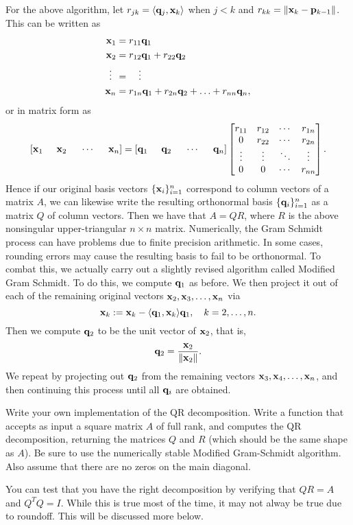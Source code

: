 For the above algorithm, let $r_{j k} = \langle {\bf q}_j, {\bf x}_k\rangle$ when $j < k$ and
$r_{kk} = \|{\bf x}_k-{\bf p}_{k-1}\|$.
This can be written as
\begin{align*}
{\bf x}_1 &= r_{1 1} {\bf q}_1\\
{\bf x}_2 &= r_{1 2} {\bf q}_1 + r_{2 2} {\bf q}_2\\
\vdots \:\: &= \quad \vdots\\
{\bf x}_n &= r_{1 n} {\bf q}_1 + r_{2 n} {\bf q}_2 + \ldots + r_{n n} {\bf q}_{n},
\end{align*}
or in matrix form as
\[
[{\bf x}_1 \hspace{5mm} {\bf x}_2 \hspace{5mm} \cdots \hspace{5mm} {\bf x}_n]
=
[{\bf q}_1 \hspace{5mm} {\bf q}_2 \hspace{5mm} \cdots \hspace{5mm} {\bf q}_n]
\begin{bmatrix}
r_{1 1} & r_{1 2} & \cdots & r_{1 n}\\
0 & r_{2 2} & \cdots & r_{2 n}\\
\vdots & \vdots & \ddots & \vdots\\
0 & 0 & \cdots & r_{n n}
\end{bmatrix}.
\]
Hence if our original basis vectors $\{{\bf x}_i\}_{i=1}^n$ correspond to column
vectors of a matrix $A$, we can likewise write the resulting
orthonormal basis $\{{\bf q}_i\}_{i=1}^n$ as a matrix $Q$ of column
vectors.  Then we have that $A = Q R$, where $R$ is the above
nonsingular upper-triangular $n\times n$ matrix.
Numerically, the Gram Schmidt process can have problems due to
finite precision arithmetic. In some cases, rounding errors may cause
the resulting basis to fail to be orthonormal. To combat this, we
actually carry out a slightly revised algorithm called Modified Gram
Schmidt.  To do this, we compute ${\bf q}_1$ as before.  We then project
it out of each of the remaining original vectors
${\bf x}_2,{\bf x}_3,\ldots,{\bf x}_n$ via
\[
{\bf x}_k := {\bf x}_k - \langle {\bf q}_1,{\bf x}_{k} \rangle {\bf q}_1,\quad k=2,\ldots,n.
\]
Then we compute ${\bf q}_2$ to be the unit vector of ${\bf x}_2$, that is,
\[
{\bf q}_2 = \frac{{\bf x}_2}{\|{\bf x}_2\|}.
\]
We repeat by projecting out ${\bf q}_2$ from the remaining vectors
${\bf x}_3,{\bf x}_4,\ldots,{\bf x}_n$, and then continuing this process until
all ${\bf q}_i$ are obtained.

\begin{problem}
\label{prob:QR}
Write your own implementation of the QR decomposition.
Write a function  that accepts as input a square matrix $A$ of full rank, 
and computes the QR decomposition, returning the matrices 
$Q$ and $R$ (which should be the same shape as $A$).
Be sure to use the numerically stable Modified Gram-Schmidt algorithm.
Also assume that there are no zeros on the main diagonal.

You can test that you have the right decomposition by verifying that $QR=A$ and $Q^T Q = I$. While this is true most of the time, it may not alway be true due to roundoff. This will be discussed more below.
\end{problem}

